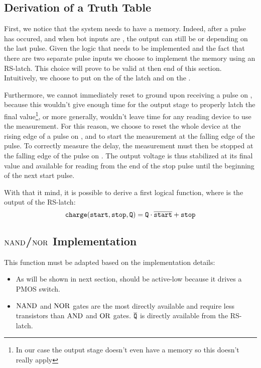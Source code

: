\subsection{Derivation of a Truth Table}
First, we notice that the system needs to have a memory.
Indeed, after a pulse has occured, and when bot inputs are , the output  can still be  or  depending on the last pulse.
Given the logic that needs to be implemented and the fact that there are two separate pulse inputs we choose to implement the memory using an RS-latch.
This choice will prove to be valid at then end of this section.
Intuitively, we choose to put  on the  of the latch and  on the .

Furthermore, we cannot immediately reset  to ground upon receiving a pulse on , because this wouldn't give enough time for the output stage to properly latch the final value\footnote{In our case the output stage doesn't even have a memory so this doesn't really apply}, or more generally, wouldn't leave time for any reading device to use the measurement.
For this reason, we choose to reset the whole device at the rising edge of a pulse on , and to start the measurement at the falling edge of the pulse.
To correctly measure the delay, the measurement must then be stopped at the falling edge of the pulse on .
The output voltage is thus stabilized at its final value and available for reading from the end of the stop pulse until the beginning of the next start pulse.

With that it mind, it is possible to derive a first logical function, where  is the output of the RS-latch:
\[
\mathtt{charge}(\mathtt{start}, \mathtt{stop}, \mathtt{Q}) = \mathtt{Q}\cdot\overline{\mathtt{start}} + \mathtt{stop}
\]

\subsection{$\operatorname{NAND}$/$\operatorname{NOR}$ Implementation}
This function must be adapted based on the implementation details:
\begin{itemize}
  \item As will be shown in next section,  should be active-low because it drives a PMOS switch.
  \item $\operatorname{NAND}$ and $\operatorname{NOR}$ gates are the most directly available and require less transistors than $\operatorname{AND}$ and $\operatorname{OR}$ gates. $\overline{\mathtt{Q}}$ is directly available from the RS-latch.
\end{itemize}

